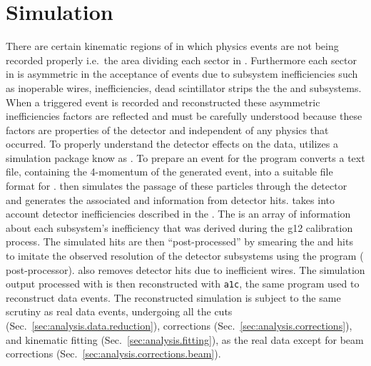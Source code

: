 \section{Simulation}\label{sec:analysis.simulation}
There are certain kinematic regions of  in which physics events are not being recorded properly i.e.~the area dividing each sector in . Furthermore each sector in  is asymmetric in the acceptance of events due to subsystem inefficiencies such as inoperable  wires,  inefficiencies, dead scintillator strips the the  and  subsystems. When a triggered event is recorded and reconstructed these asymmetric inefficiencies factors are reflected and must be carefully understood because these factors are properties of the  detector and independent of any physics that occurred. To properly understand the detector effects on the data,  utilizes a  simulation package know as . To prepare an event for  the program  converts a text file, containing the 4-momentum of the generated event, into a suitable file format for .  then simulates the passage of these particles through the  detector and generates the associated  and  information from detector hits.  takes into account detector inefficiencies described in the . The  is an array of information about each subsystem's inefficiency that was derived during the g12 calibration process. The  simulated hits are then ``post-processed'' by smearing the  and  hits to imitate the observed resolution of the detector subsystems using the program  ( post-processor).  also removes detector hits due to inefficient  wires. The simulation output processed with  is then reconstructed with \texttt{a1c}, the same program used to reconstruct data events. The reconstructed simulation is subject to the same scrutiny as real data events, undergoing all the cuts (Sec.~\ref{sec:analysis.data.reduction}), corrections (Sec.~\ref{sec:analysis.corrections}), and kinematic fitting (Sec.~\ref{sec:analysis.fitting}), as the real data except for beam corrections (Sec.~\ref{sec:analysis.corrections.beam}).







